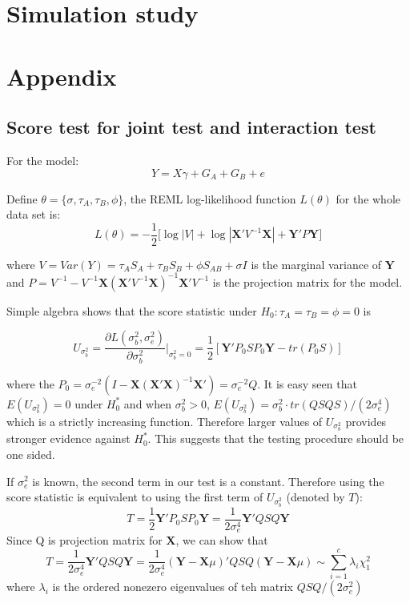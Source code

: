 \documentclass{article}
\newcommand{\Y}{\mathbf{Y}}
\newcommand{\X}{\mathbf{X}}
\begin{document}
    \section{Simulation study}



    \section{Appendix}

        \subsection{Score test for joint test and interaction test}

            For the model:
            \begin{equation*}
                Y=X\gamma+G_A+G_B+e
            \end{equation*}

            Define $\theta=\{\sigma,\tau_A,\tau_B,\phi\}$, the REML log-likelihood function $L(\theta)$ for the whole data set is:
            \[
                L(\theta)=-\frac{1}{2}\bigg[\log|V|+\log|\X'V^{-1}\X|+\Y'P\Y\bigg]
            \]

             where $V=Var(Y)=\tau_AS_A+\tau_BS_B+\phi S_{AB}+\sigma I$ is the marginal variance of $\Y$ and $P=V^{-1}-V^{-1}\X(\X'V^{-1}\X)^{-1}\X'V^{-1}$ is the projection matrix for the model.

            Simple algebra shows that the score statistic under $H_0:\tau_A=\tau_B=\phi=0$ is

            \[
                U_{\sigma^2_b}=\frac{\partial L(\sigma^2_b,\sigma^2_e)}{\partial \sigma^2_b}\bigg|_{\sigma^2_b=0}=\frac{1}{2}[\Y'P_0SP_0\Y-tr(P_0S)]
            \]

            where the $P_0=\sigma^{-2}_e(I-\X(\X'\X)^{-1}\X')=\sigma^{-2}_eQ$. It is easy seen that $E(U_{\sigma^2_b})=0$ under $H_0^*$ and when $\sigma^2_b>0$, $E(U_{\sigma^2_b})=\sigma^2_b\cdot tr(QSQS)/(2\sigma^4_e)$ which is a strictly increasing function. Therefore larger values of $U_{\sigma_b^2}$ provides stronger evidence against $H_0^*$. This suggests that the testing procedure should be one sided.

            If $\sigma_e^2$ is known, the second term in our test is a constant. Therefore using the score statistic is equivalent to using the first term of $U_{\sigma^2_b}$ (denoted by $T$):
            \[
                T=\frac{1}{2}\Y'P_0SP_0\Y=\frac{1}{2\sigma^4_e}\Y'QSQ\Y
            \]
            Since Q is projection matrix for $\X$, we can show that
            \[
                T=\frac{1}{2\sigma^4_e}\Y'QSQ\Y=\frac{1}{2\sigma^4_e}(\Y-\X\mu)'QSQ(\Y-\X\mu)\sim\sum_{i=1}^c\lambda_i\chi^2_1
            \]
            where $\lambda_i$ is the ordered nonezero eigenvalues of teh matrix $QSQ/(2\sigma^2_e)$
\end{document}
